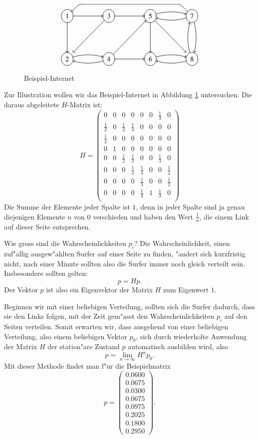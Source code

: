 \begin{figure}
\[\UseTips
\entrymodifiers={++[o][F]}
\xymatrix @=1.5cm {
1 \ar[r] \ar[d]
	& 3 \ar[r] \ar@(dl,dl)[dl]
		& 5 \ar[d] \ar@/^/[r] \ar@(dr,dr)[rd]
			& 7 \ar@/^/[d]  \ar@/^/[l]
\ar `ul^l[lll]+/u6mm/`l^dl[lll] [lll]
\\
2 \ar@/^/[r]
	& 4 \ar@/^/[l] \ar[r] \ar[ur]
		& 6 \ar@/^/[r]
			& 8 \ar@/^/[l] \ar@/^/[u]
}
\]
\caption{Beispiel-Internet\label{google-sample}}
\end{figure}
Zur Illustration wollen wir das Beispiel-Internet in Abbildung \ref{google-sample}
untersuchen.
Die daraus abgeleitete $H$-Matrix ist:
\[
H=\left(
\begin{matrix}
0&0&0&0&0&0&\frac13&0\\
\frac12&0&\frac12&\frac13&0&0&0&0\\
\frac12&0&0&0&0&0&0&0\\
0&1&0&0&0&0&0&0\\
0&0&\frac12&\frac13&0&0&\frac13&0\\
0&0&0&\frac13&\frac13&0&0&\frac12\\
0&0&0&0&\frac13&0&0&\frac12\\
0&0&0&0&\frac13&1&\frac13&0\\
\end{matrix}
\right)
\]
Die Summe der Elemente jeder Spalte ist $1$, denn in jeder Spalte sind ja genau
diejenigen Elemente $n$ von $0$ verschieden und haben den Wert $\frac1n$,
die einem Link auf dieser Seite entsprechen.

Wie gross sind die Wahrscheinlichkeiten $p_i$? Die Wahrscheinlichkeit, einen zuf"allig
ausgew"ahlten Surfer auf einer Seite zu finden, "andert sich kurzfristig nicht, nach
einer Minute sollten also die Surfer immer noch gleich verteilt sein.
Insbesondere
sollten gelten:
\[
p=Hp.
\]
Der Vektor $p$ ist also ein Eigenvektor der Matrix $H$ zum Eigenwert $1$.

Beginnen wir mit einer beliebigen Verteilung, sollten sich die Surfer dadurch,
dass sie den Links folgen, mit der Zeit gem"asst den Wahrscheinlichkeiten $p_i$
auf den Seiten verteilen.
Somit erwarten wir, dass ausgehend von einer beliebigen
Verteilung, also einem beliebigen Vektor $p_0$, sich durch wiederholte Anwendung der
Matrix $H$ der station"are Zustand $p$ automatisch ausbilden wird, also
\[
p=\lim_{n\to\infty}H^np_0.
\]
Mit dieser Methode findet man f"ur die Beispielmatrix
\[
p=\left(
\begin{matrix}
0.0600\\0.0675\\0.0300\\0.0675\\0.0975\\0.2025\\0.1800\\0.2950
\end{matrix}
\right).
\]

